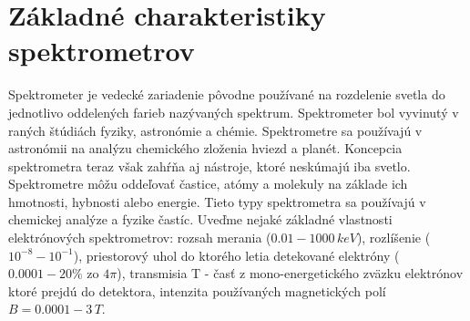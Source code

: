 \documentclass[../../main.tex]{subfiles}
\begin{document}
\chapter{Základné charakteristiky spektrometrov}
Spektrometer je vedecké zariadenie pôvodne používané na rozdelenie svetla do jednotlivo oddelených farieb nazývaných spektrum. Spektrometer bol vyvinutý v raných štúdiách fyziky, astronómie a chémie. Spektrometre sa používajú v astronómii na analýzu chemického zloženia hviezd a planét. Koncepcia spektrometra teraz však zahŕňa aj nástroje, ktoré neskúmajú iba svetlo. Spektrometre môžu oddeľovať častice, atómy a molekuly na základe ich hmotnosti, hybnosti alebo energie. Tieto typy spektrometra sa používajú v chemickej analýze a fyzike častíc. Uveďme nejaké základné vlastnosti elektrónových spektrometrov: rozsah merania ($0.01-1000\,keV$), rozlíšenie ($10^{-8}-10^{-1}$), priestorový uhol do ktorého letia detekované elektróny ($0.0001-20 \% $ zo $4\pi$), transmisia T - časť z mono-energetického zväzku elektrónov ktoré prejdú do detektora, intenzita používaných magnetických polí $B=0.0001-3\,T$.
\end{document}
